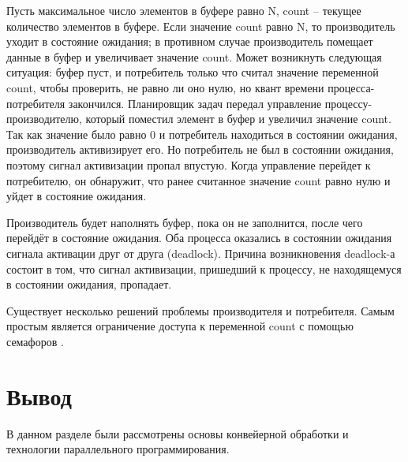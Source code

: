         Пусть максимальное число элементов в буфере равно N,
        count -- текущее количество элементов в буфере.
        Если значение count равно N, то производитель уходит в состояние ожидания;
        в противном случае производитель помещает данные в буфер и увеличивает значение count.
        Может возникнуть следующая ситуация: буфер пуст, и потребитель только что считал значение перемен­ной count,
        чтобы проверить, не равно ли оно нулю, но квант времени процесса-потребителя закончился.
        Планировщик задач передал управление процессу-производителю,
        который поместил элемент в буфер и увеличил значение count.
        Так как значение было равно 0 и потребитель находиться в состоянии ожидания,
        производитель активизирует его. Но потребитель не был в состоянии ожидания,
        поэтому сигнал активизации про­пал впустую. 
        Когда управление перейдет к потребителю, 
        он обнаружит, что ранее считанное значение count равно нулю и уйдет в состояние ожидания.

        Производитель будет наполнять буфер, пока он не заполнится, после чего перейдёт в состояние ожидания.
        Оба процесса оказались в состоянии ожидания сигнала активации друг от друга (deadlock).
        Причина возникновения deadlock-а состоит в том,
        что сигнал активизации, при­шедший к процессу,
        не находящемуся в состоянии ожидания, пропадает.

        Существует несколько решений проблемы производителя и потребителя. 
        Самым простым является ограничение доступа к переменной 
        count с помощью семафоров \cite{parll1}.  
        
    \section{Вывод}
        В данном разделе были рассмотрены основы конвейерной обработки и технологии параллельного программирования.

\newpage